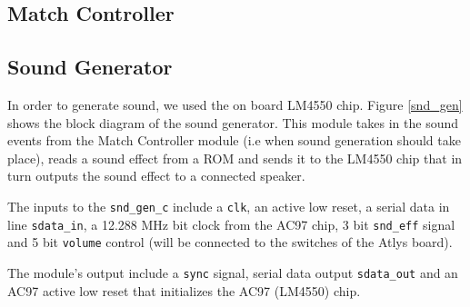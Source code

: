     \subsection{Match Controller}
    
    \newpage
	  \subsection{Sound Generator}
				In order to generate sound, we used the on board LM4550 chip. Figure \ref{snd_gen} shows the block diagram of the sound generator. This module takes in the sound events from the Match Controller module (i.e when sound generation should take place), reads a sound effect from a ROM and sends it to the LM4550 chip that in turn outputs the sound effect to a connected speaker.
				
				The inputs to the \texttt{snd\_gen\_c} include a \texttt{clk}, an active low reset, a serial data in line \texttt{sdata\_in}, a 12.288 MHz bit clock from the AC97 chip, 3 bit \texttt{snd\_eff} signal and 5 bit \texttt{volume} control (will be connected to the switches of the Atlys board).
				
				The module's output include a \texttt{sync} signal, serial data output \texttt{sdata\_out} and an AC97 active low reset that initializes the AC97 (LM4550) chip. 
				
